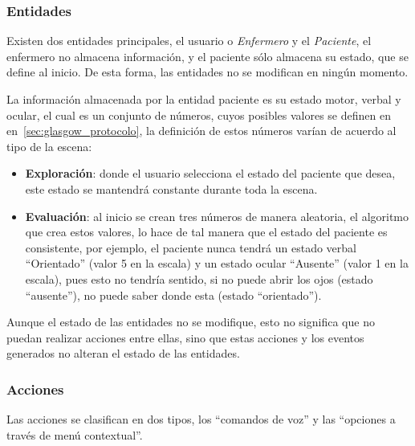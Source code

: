 \subsubsection{Entidades}


Existen dos entidades principales, el usuario o \emph{Enfermero} y el \emph{Paciente}, 
el enfermero no almacena información, y el
paciente sólo almacena su estado, que se define al inicio. De esta forma, las
entidades no se modifican en ningún momento.

La información almacenada por la entidad paciente es su estado motor, verbal y
ocular, el cual es un conjunto de números, cuyos posibles valores se definen en
en~\ref{sec:glasgow_protocolo}, la definición de estos números varían de acuerdo
al tipo de la escena:

\begin{itemize}
    \item \textbf{Exploración}: donde el usuario selecciona el estado
        del paciente que desea, este estado se mantendrá constante durante toda
        la escena.
    \item \textbf{Evaluación}: al inicio se crean tres números de manera
        aleatoria, el algoritmo que crea estos valores, lo hace de tal manera
        que el estado del paciente es consistente, por ejemplo, el paciente
        nunca tendrá un estado verbal \enquote{Orientado} (valor 5 en la escala)
        y un estado ocular \enquote{Ausente} (valor 1 en la escala), pues esto
        no tendría sentido, si no puede abrir los ojos (estado
        \enquote{ausente}), no puede saber donde esta (estado
        \enquote{orientado}).
\end{itemize}

Aunque el estado de las entidades no se modifique, esto no significa que no
puedan realizar acciones entre ellas, sino que estas acciones y los eventos
generados no alteran el estado de las entidades.


\subsubsection{Acciones} 

Las acciones se clasifican en dos tipos, los \enquote{comandos de voz} y las
\enquote{opciones a través de menú contextual}. 

